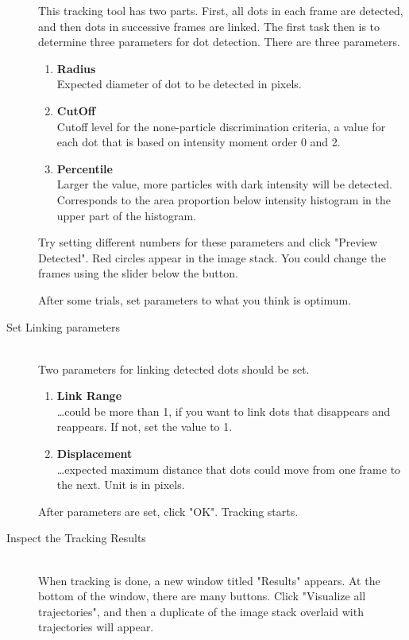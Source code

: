 \documentclass[11pnt]{article}
\begin{document}
\begin{description}
This tracking tool has two parts. First, all dots in each frame are detected, and then dots in successive frames are linked. The first task then is to determine three parameters for dot detection. There are three parameters. 
\begin{enumerate}
\item \textbf{Radius}\hfill\\
Expected diameter of dot to be detected in pixels. 
\item \textbf{CutOff}\hfill\\
Cutoff level for the none-particle discrimination criteria, a value for each dot that is based on intensity moment order 0 and 2. 
\item \textbf{Percentile}\hfill\\
Larger the value, more particles with dark intensity will be detected. Corresponds to the area proportion below intensity histogram in the upper part of the histogram. 
\end{enumerate}
Try setting different numbers for these parameters and click "Preview Detected". Red circles appear in the image stack. You could change the frames using the slider below the button. 

After some trials, set parameters to what you think is optimum. 

\item[Set Linking parameters]\hfill\\

Two parameters for linking detected dots should be set. 
\begin{enumerate}
\item \textbf{Link Range}\hfill\\
\dots could be more than 1, if you want to link dots that disappears and reappears. If not, set the value to 1.
\item \textbf{Displacement}\hfill\\
\dots expected maximum distance that dots could move from one frame to the next. Unit is in pixels. 
\end{enumerate}
After parameters are set, click "OK". Tracking starts. 

\item[Inspect the Tracking Results]\hfill\\

When tracking is done, a new window titled "Results" appears. At the bottom of the window, there are many buttons. Click "Visualize all trajectories", and then a duplicate of the image stack overlaid with trajectories will appear. 


\end{description}
\end{document}
